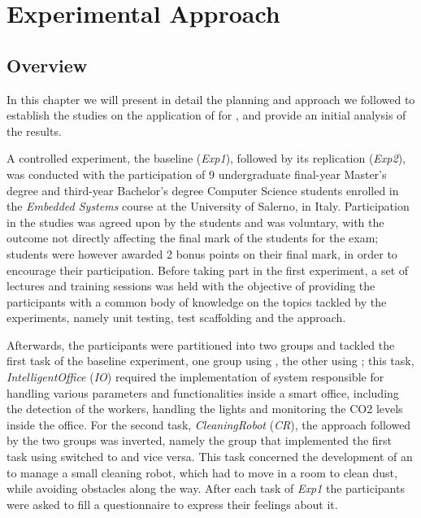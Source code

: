 \chapter{Experimental Approach}
\section{Overview}
In this chapter we will present in detail the planning and approach we followed to establish the studies on the application of \tdd for \ess, and provide an initial analysis of the results.

A controlled experiment, the baseline (\textit{Exp1}), followed by its replication (\textit{Exp2}), was conducted with the participation of 9 undergraduate final-year Master's degree and third-year Bachelor's degree Computer Science students enrolled in the \textit{Embedded Systems} course at the University of Salerno, in Italy. Participation in the studies was agreed upon by the students and was voluntary, with the outcome not directly affecting the final mark of the students for the exam; students were however awarded 2 bonus points on their final mark, in order to encourage their participation.
Before taking part in the first experiment, a set of lectures and training sessions was held with the objective of providing the participants with a common body of knowledge on the topics tackled by the experiments, namely unit testing, test scaffolding and the \tdd approach.

Afterwards, the participants were partitioned into two groups and tackled the first task of the baseline experiment, one group using \tdd, the other using \notdd; this task, \textit{IntelligentOffice} (\textit{IO}) required the implementation of system responsible for handling various parameters and functionalities inside a smart office, including the detection of the workers, handling the lights and monitoring the CO2 levels inside the office.
For the second task, \textit{CleaningRobot} (\textit{CR}), the approach followed by the two groups was inverted, namely the group that implemented the first task using \tdd switched to \notdd and vice versa. This task concerned the development of an \es to manage a small cleaning robot, which had to move in a room to clean dust, while avoiding obstacles along the way.
After each task of \textit{Exp1} the participants were asked to fill a questionnaire to express their feelings about it.

